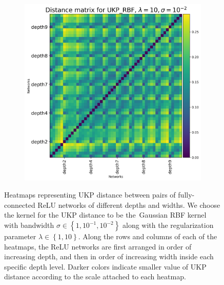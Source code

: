 \documentclass[11pt]{article}
\newcommand{\metricstname}{UKP }
\theoremstyle{plain}
\begin{document}
\begin{figure}[!h]
\begin{subfigure}[b]{0.3\textwidth}
    \end{subfigure}
    \hfill
    \begin{subfigure}[b]{0.3\textwidth}
        \includegraphics[width=\textwidth]{Appendix figures/mnist_experiments/Heatmaps/Heatmap for UKP_dist_RBF_1.000000e+01_1.000000e-02.png}
    \end{subfigure}
    
    \caption{Heatmaps representing \metricstname distance between pairs of fully-connected ReLU networks of different depths and widths. We choose the kernel for the \metricstname distance to be the Gaussian RBF kernel with bandwidth $\sigma \in \left\{1,10^{-1},10^{-2}\right\}$ along with the regularization parameter $\lambda \in \left\{1,10\right\}$. Along the rows and columns of each of the heatmaps, the ReLU networks are first arranged in order of increasing depth, and then in order of increasing width inside each specific depth level. Darker colors indicate smaller value of \metricstname distance according to the scale attached to each heatmap.}
    \label{MNIST Heatmaps}
\end{figure}
\end{document}
